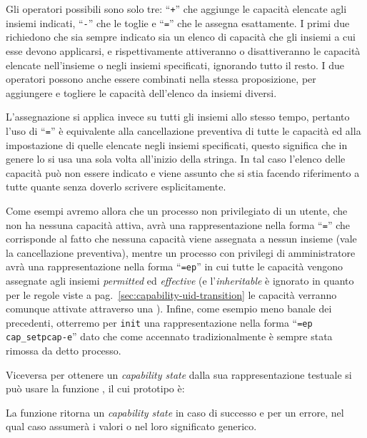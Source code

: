 Gli operatori possibili sono solo tre: ``\texttt{+}'' che aggiunge le capacità
elencate agli insiemi indicati, ``\texttt{-}'' che le toglie e ``\texttt{=}''
che le assegna esattamente. I primi due richiedono che sia sempre indicato sia
un elenco di capacità che gli insiemi a cui esse devono applicarsi, e
rispettivamente attiveranno o disattiveranno le capacità elencate nell'insieme
o negli insiemi specificati, ignorando tutto il resto. I due operatori possono
anche essere combinati nella stessa proposizione, per aggiungere e togliere le
capacità dell'elenco da insiemi diversi.

L'assegnazione si applica invece su tutti gli insiemi allo stesso tempo,
pertanto l'uso di ``\texttt{=}'' è equivalente alla cancellazione preventiva
di tutte le capacità ed alla impostazione di quelle elencate negli insiemi
specificati, questo significa che in genere lo si usa una sola volta
all'inizio della stringa. In tal caso l'elenco delle capacità può non essere
indicato e viene assunto che si stia facendo riferimento a tutte quante senza
doverlo scrivere esplicitamente.

Come esempi avremo allora che un processo non privilegiato di un utente, che
non ha nessuna capacità attiva, avrà una rappresentazione nella forma
``\texttt{=}'' che corrisponde al fatto che nessuna capacità viene assegnata a
nessun insieme (vale la cancellazione preventiva), mentre un processo con
privilegi di amministratore avrà una rappresentazione nella forma
``\texttt{=ep}'' in cui tutte le capacità vengono assegnate agli insiemi
\textit{permitted} ed \textit{effective} (e l'\textit{inheritable} è ignorato
in quanto per le regole viste a pag.~\ref{sec:capability-uid-transition} le
capacità verranno comunque attivate attraverso una ). Infine, come
esempio meno banale dei precedenti, otterremo per \texttt{init} una
rappresentazione nella forma ``\texttt{=ep cap\_setpcap-e}'' dato che come
accennato tradizionalmente  è sempre stata rimossa da
detto processo.

Viceversa per ottenere un \textit{capability state} dalla sua rappresentazione
testuale si può usare la funzione , il cui prototipo è:

\begin{funcproto}{
}

{La funzione ritorna un \textit{capability state} in caso di successo e
   per un errore, nel qual caso  assumerà i valori
   o  nel loro significato generico.}
\end{funcproto}


